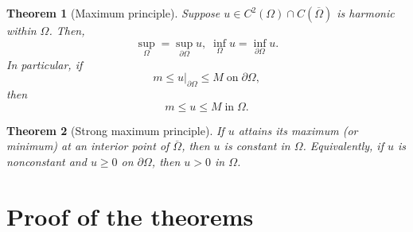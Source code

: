 \documentclass{article}
\newtheorem{theo}{Theorem}[section]
\begin{document}
\begin{theo}[Maximum principle] \label{theo:maximum_principle}
    Suppose $u \in C^2(\Omega) \cap C(\overline{\Omega})$ is harmonic within $\Omega$. Then,
    \begin{equation}
        \nonumber
        \sup \limits_{\Omega} = \sup \limits_{\partial \Omega} u, \; \inf \limits_{\Omega} u = \inf \limits_{\partial \Omega} u.
    \end{equation}
    In particular, if 
    \begin{equation}
        \nonumber
        m \leq u|_{\partial \Omega} \leq M \; \text{on} \; \partial \Omega,
    \end{equation}
    then
    \begin{equation}
        \nonumber
        m \leq u \leq M \; \text{in} \; \Omega.
    \end{equation}
\end{theo}

\begin{theo}[Strong maximum principle]\label{theo:strong_maximum_principle}
    If $u$ attains its maximum (or minimum) at an interior point of $\overline{\Omega}$, then $u$ is constant in $\Omega$. Equivalently, if $u$ is nonconstant and $u \geq 0$ on $\partial \Omega$, then $u > 0$ in $\Omega$.
\end{theo}


\section{Proof of the theorems}
\label{ap:proofs}


\end{document}

